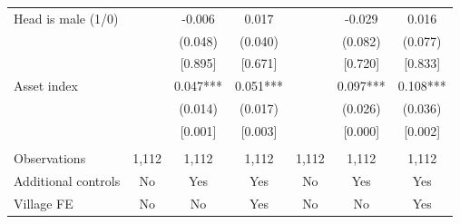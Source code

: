 \documentclass[]{article}
\begin{document}
\begin{tabular}{lcccccc}
Head is male (1/0) &  & -0.006 & 0.017 &  & -0.029 & 0.016 \\
 &  & (0.048) & (0.040) &  & (0.082) & (0.077) \\
 &  & [0.895] & [0.671] &  & [0.720] & [0.833] \\
Asset index &  & 0.047*** & 0.051*** &  & 0.097*** & 0.108*** \\
 &  & (0.014) & (0.017) &  & (0.026) & (0.036) \\
 &  & [0.001] & [0.003] &  & [0.000] & [0.002] \\
 &  &  &  &  &  &  \\
Observations & 1,112 & 1,112 & 1,112 & 1,112 & 1,112 & 1,112 \\
Additional controls & No & Yes & Yes & No & Yes & Yes \\
 Village FE & No & No & Yes & No & No & Yes \\ \hline
\end{tabular}
\end{document}
